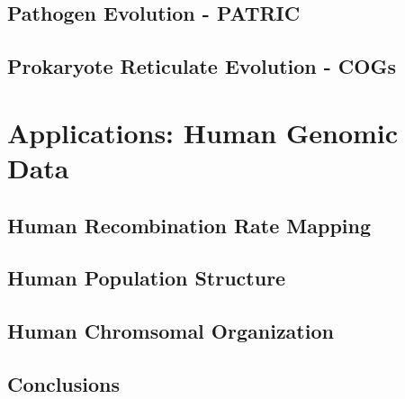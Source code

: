 \documentclass[letterpaper,12pt,twoside]{memoir}
\begin{document}
\chapter{Pathogen Evolution - PATRIC}
\label{ch:pathogens}

\lipsum

\chapter{Prokaryote Reticulate Evolution - COGs}
\label{ch:prokaryotes}
\lipsum
% 


\part{Applications: Human Genomic Data}
\label{part:human}

\chapter{Human Recombination Rate Mapping}
\lipsum

\chapter{Human Population Structure}
\lipsum

\chapter{Human Chromsomal Organization}
\lipsum
% 


\chapter{Conclusions}
\label{ch:conclusions}
\lipsum
% 

\backmatter

\SingleSpacing
\printbibliography
\end{document}
